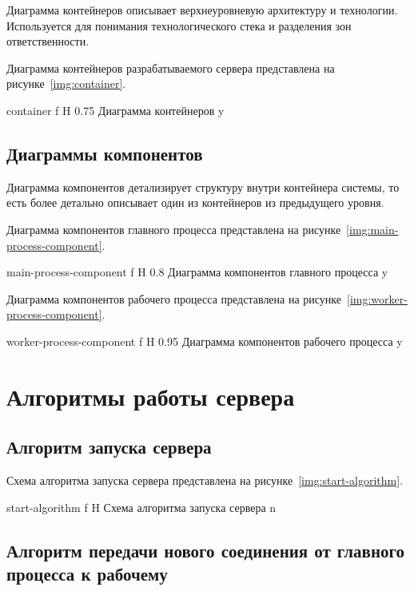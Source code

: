 Диаграмма контейнеров описывает верхнеуровневую архитектуру и технологии. Используется для понимания технологического стека и разделения зон ответственности.

Диаграмма контейнеров разрабатываемого сервера представлена на рисунке~\ref{img:container}.

{container}
{f} %
{H}
{0.75\textheight} %
{Диаграмма контейнеров}
{y}

\subsection{Диаграммы компонентов}

Диаграмма компонентов детализирует структуру внутри контейнера системы, то есть более детально описывает один из контейнеров из предыдущего уровня. 

Диаграмма компонентов главного процесса представлена на рисунке~\ref{img:main-process-component}.

{main-process-component}
{f} %
{H}
{0.8\textheight} %
{Диаграмма компонентов главного процесса}
{y}

Диаграмма компонентов рабочего процесса представлена на рисунке~\ref{img:worker-process-component}.

{worker-process-component}
{f} %
{H}
{0.95\textheight} %
{Диаграмма компонентов рабочего процесса}
{y}

\section{Алгоритмы работы сервера}

\subsection{Алгоритм запуска сервера}

Схема алгоритма запуска сервера представлена на рисунке~\ref{img:start-algorithm}.

{start-algorithm}
{f} %
{H}
{\textwidth} %
{Схема алгоритма запуска сервера}
{n}

\newpage

\subsection{Алгоритм передачи нового соединения от главного процесса к рабочему}

